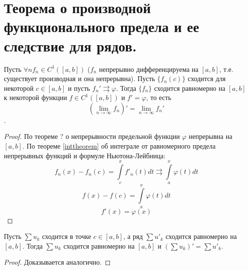 \section{Теорема о производной функционального предела и ее следствие для рядов.}

\begin{theorem}
    Пусть $\forall n f_n \in C^1([a, b])$ ($f_n$ непрерывно дифференцируема на $[a,b]$, т.е. существует производная и она непрерывна). Пусть $\{f_n(c)\}$ сходится для некоторой $c \in [a,b]$ и пусть $f_n' \rightrightarrows \varphi$. Тогда $\{f_n\}$ сходится равномерно на $[a,b]$ к некоторой функции $f \in C^1([a,b])$ и $f' = \varphi$, то есть $$\left(\lim_{n \to \infty} f_n\right)' = \lim_{n \to \infty} f_n'$$.
    \begin{proof}
        По теореме ? о непрерывности предельной функции $\varphi$ непрерывна на $[a,b]$.
        По теореме \ref{inttheorem} об интеграле от равномерного предела непрерывных функций и формуле Ньютона-Лейбница:
        \[
            f_n(x) - f_n(c) =
            \int \limits_c^x f'_n(t) dt
            \rightrightarrows
            \int \limits_a^x \varphi(t) dt
        \]
        \[
            f(x) - f(c) = \int \limits_a^x \varphi(t) dt
        \]
        \[
            f'(x) = \varphi(x)
        \]
    \end{proof}
\end{theorem}

\begin{theorem}
    Пусть $\sum u_k$ сходится в точке $c \in [a, b]$, а ряд $\sum u'_k$ сходится равномерно на $[a,b]$. Тогда $\sum u_k$ сходится равномерно на $[a,b]$ и $(\sum u_k)' = \sum u'_k$.
    \begin{proof}
        Доказывается аналогично.
    \end{proof}
\end{theorem}